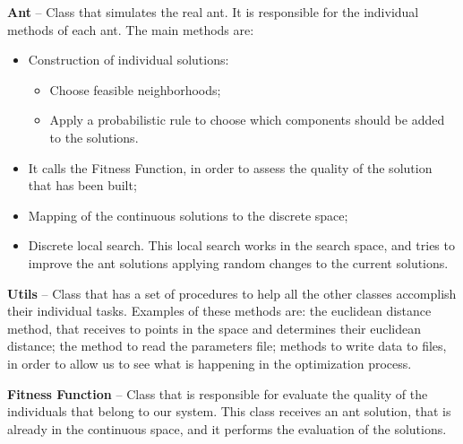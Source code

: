 \textbf{Ant} – Class that simulates the real ant. It is responsible for the individual methods of each ant. The main methods are:
\begin{itemize}
	\item Construction of individual solutions:
		\begin{itemize}
			\item Choose feasible neighborhoods;
			\item Apply a probabilistic rule to choose which components should be added to the solutions.
		\end{itemize}
	\item It calls the Fitness Function, in order to assess the quality of the solution that has been built;
	\item Mapping of the continuous solutions to the discrete space;
	\item Discrete local search. This local search works in the search space, and tries to improve the ant solutions applying random changes to the current solutions.
\end{itemize}

\textbf{Utils} – Class that has a set of procedures to help all the other classes accomplish their individual tasks. Examples of these methods are: the euclidean distance method, that receives to points in the space and determines their euclidean distance; the method to read the parameters file; methods to write data to files, in order to allow us to see what is happening in the optimization process.

\textbf{Fitness Function} – Class that is responsible for evaluate the quality of the individuals that belong to our system. This class receives an ant solution, that is already in the continuous space, and it performs the evaluation of the solutions.

